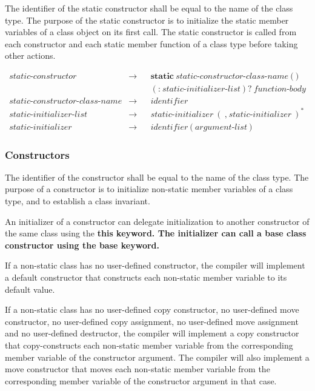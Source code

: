 \documentclass[a4paper,oneside,11pt]{article}
\begin{document}
The identifier of the static constructor shall be equal to the name of the class type.
The purpose of the static constructor is to initialize the static member variables of a class object on its first call.
The static constructor is called from each constructor and each static member function of a class type
before taking other actions.

\begin{align*}
static\textrm{-}constructor &\rightarrow & &\textbf{static} \> static\textrm{-}constructor\textrm{-}class\textrm{-}name \> \texttt{(} \> \texttt{)}\\
& & &(\texttt{:} \> static\textrm{-}initializer\textrm{-}list)? \> \hyperref[functionbody]{function\textrm{-}body}\\
static\textrm{-}constructor\textrm{-}class\textrm{-}name &\rightarrow & &\hyperref[identifier]{identifier}\\
static\textrm{-}initializer\textrm{-}list &\rightarrow & &static\textrm{-}initializer \> (\> \texttt{,} \> static\textrm{-}initializer \>)^*\\
static\textrm{-}initializer &\rightarrow & &\hyperref[identifier]{identifier} \> \texttt{(} \> \hyperref[argumentlist]{argument\textrm{-}list} \> \texttt{)}
\end{align*}

\subsubsection{Constructors}\label{constructor}

The identifier of the constructor shall be equal to the name of the class type.
The purpose of a constructor is to initialize non-static member variables of a class type,
and to establish a class invariant.

An initializer of a constructor can delegate initialization to another constructor of
the same class using the \bf{this} keyword.
The initializer can call a base class constructor using the \bf{base} keyword.

If a non-static class has no user-defined constructor, the compiler will implement a default constructor that constructs
each non-static member variable to its default value.

If a non-static class has no user-defined copy constructor,
no user-defined move constructor, no user-defined copy assignment, no user-defined move assignment and no user-defined destructor,
the compiler will implement a copy constructor that
copy-constructs each non-static member variable from the corresponding member variable of the constructor argument.
The compiler will also implement a move constructor that moves each non-static member variable from the corresponding
member variable of the constructor argument in that case.
\end{document}
